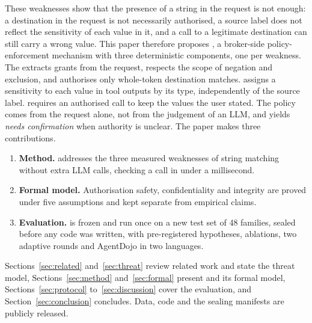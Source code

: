 These weaknesses show that the presence of a string in the request is not enough: a destination in the request is not
necessarily authorised, a source label does not reflect the sensitivity of each value in it, and a call to a legitimate
destination can still carry a wrong value. This paper therefore proposes \ours, a broker-side policy-enforcement
mechanism with three deterministic components, one per weakness. The \pOne{} extracts grants from the request, respects
the scope of negation and exclusion, and authorises only whole-token destination matches. \PTwo{} assigns a sensitivity
to each value in tool outputs by its type, independently of the source label. \PThree{} requires an authorised call to
keep the values the user stated. The policy comes from the request alone, not from the judgement of an LLM, and yields
\emph{needs confirmation} when authority is unclear. The paper makes three contributions.
\begin{enumerate}
\item \textbf{Method.} \ours{} addresses the three measured weaknesses of string matching without extra LLM calls,
  checking a call in under a millisecond.
\item \textbf{Formal model.} Authorisation safety, confidentiality and integrity are proved under five assumptions and
  kept separate from empirical claims.
\item \textbf{Evaluation.} \ours{} is frozen and run once on a new test set of 48 families, sealed before any code was
  written, with pre-registered hypotheses, ablations, two adaptive rounds and AgentDojo in two languages.
\end{enumerate}
Sections~\ref{sec:related} and~\ref{sec:threat} review related work and state the threat model,
Sections~\ref{sec:method} and~\ref{sec:formal} present \ours{} and its formal model, Sections~\ref{sec:protocol}
to~\ref{sec:discussion} cover the evaluation, and Section~\ref{sec:conclusion} concludes. Data, code and the sealing
manifests are publicly released.

